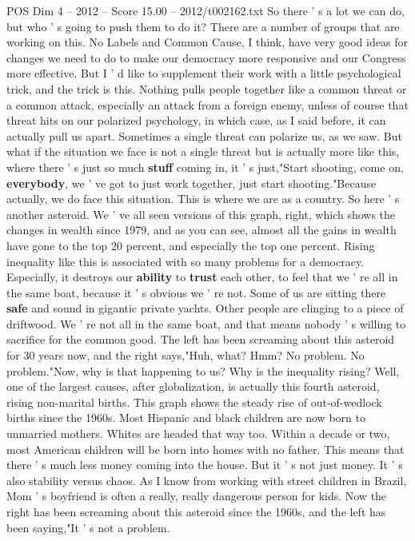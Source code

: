 \begin{textsample}{POS Dim 4 – 2012 – Score 15.00 – 2012/t002162.txt}
So there ' s a lot we can do, but who ' s going to push them to do it?
There are a number of groups that are working on this.
No Labels and Common Cause, I think, have very good ideas for changes we need to do to make our democracy more responsive and our Congress more effective.
But I ' d like to supplement their work with a little psychological trick, and the trick is this.
Nothing pulls people together like a common threat or a common attack, especially an attack from a foreign enemy, unless of course that threat hits on our polarized psychology, in which case, as I said before, it can actually pull us apart.
Sometimes a single threat can polarize us, as we saw.
But what if the situation we face is not a single threat but is actually more like this, where there ' s just so much \textbf{stuff} coming in, it ' s just,"Start shooting, come on, \textbf{everybody}, we ' ve got to just work together, just start shooting."Because actually, we do face this situation.
This is where we are as a country.
So here ' s another asteroid.
We ' ve all seen versions of this graph, right, which shows the changes in wealth since 1979, and as you can see, almost all the gains in wealth have gone to the top 20 percent, and especially the top one percent.
Rising inequality like this is associated with so many problems for a democracy.
Especially, it destroys our \textbf{ability} to \textbf{trust} each other, to feel that we ' re all in the same boat, because it ' s obvious we ' re not.
Some of us are sitting there \textbf{safe} and sound in gigantic private yachts.
Other people are clinging to a piece of driftwood.
We ' re not all in the same boat, and that means nobody ' s willing to sacrifice for the common good.
The left has been screaming about this asteroid for 30 years now, and the right says,"Huh, what?
Hmm?
No problem.
No problem."Now, why is that happening to us?
Why is the inequality rising?
Well, one of the largest causes, after globalization, is actually this fourth asteroid, rising non-marital births.
This graph shows the steady rise of out-of-wedlock births since the 1960s.
Most Hispanic and black children are now born to unmarried mothers.
Whites are headed that way too.
Within a decade or two, most American children will be born into homes with no father.
This means that there ' s much less money coming into the house.
But it ' s not just money.
It ' s also stability versus chaos.
As I know from working with street children in Brazil, Mom ' s boyfriend is often a really, really dangerous person for kids.
Now the right has been screaming about this asteroid since the 1960s, and the left has been saying,"It ' s not a problem.

\end{textsample}
